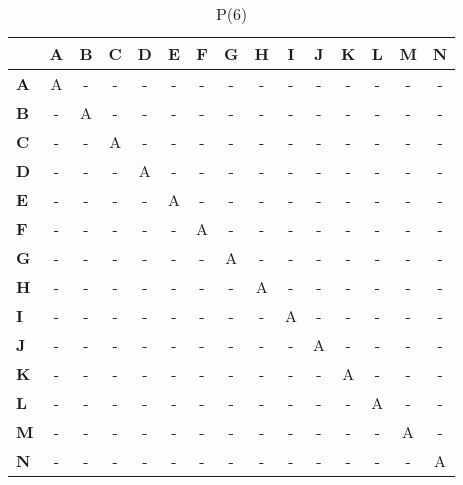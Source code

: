 \documentclass{article}
\begin{document}
\begin{table}[H]\centering
\caption{P(6)}
\begin{tabular}{l c c c c c c c c c c c c c c}
\toprule
 & \textbf{A} & \textbf{B} & \textbf{C} & \textbf{D} & \textbf{E} & \textbf{F} & \textbf{G} & \textbf{H} & \textbf{I} & \textbf{J} & \textbf{K} & \textbf{L} & \textbf{M} & \textbf{N}\\\midrule
\textbf{A} & A & - & - & - & - & - & - & - & - & - & - & - & - & - \\
\textbf{B} & - & A & - & - & - & - & - & - & - & - & - & - & - & - \\
\textbf{C} & - & - & A & - & - & - & - & - & - & - & - & - & - & - \\
\textbf{D} & - & - & - & A & - & - & - & - & - & - & - & - & - & - \\
\textbf{E} & - & - & - & - & A & - & - & - & - & - & - & - & - & - \\
\textbf{F} & - & - & - & - & - & A & - & - & - & - & - & - & - & - \\
\textbf{G} & - & - & - & - & - & - & A & - & - & - & - & - & - & - \\
\textbf{H} & - & - & - & - & - & - & - & A & - & - & - & - & - & - \\
\textbf{I} & - & - & - & - & - & - & - & - & A & - & - & - & - & - \\
\textbf{J} & - & - & - & - & - & - & - & - & - & A & - & - & - & - \\
\textbf{K} & - & - & - & - & - & - & - & - & - & - & A & - & - & - \\
\textbf{L} & - & - & - & - & - & - & - & - & - & - & - & A & - & - \\
\textbf{M} & - & - & - & - & - & - & - & - & - & - & - & - & A & - \\
\textbf{N} & - & - & - & - & - & - & - & - & - & - & - & - & - & A \\
\bottomrule
\end{tabular}
\end{table}
\end{document}
